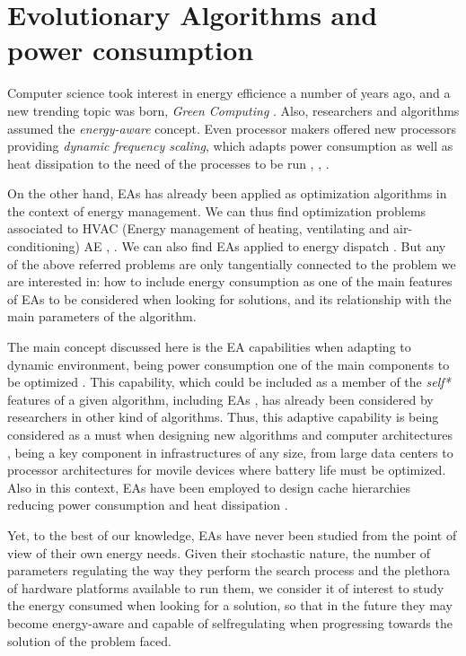 \section{Evolutionary Algorithms and power consumption}
\label{eas}

Computer science took interest in energy efficience a number of years ago, and a new trending topic was born, \textit{Green Computing} \cite{green-computing}.  Also, researchers and algorithms assumed the \textit{energy-aware} \cite{energy-aware} concept.  Even processor makers offered new processors providing \textit{dynamic frequency scaling}, which adapts power consumption as well as heat dissipation to the need of the processes to be run \cite{scaling}, \cite{dynamic-scaling}, \cite{energy-efficient}.

On the other hand, EAs has already been applied as optimization algorithms in the context of energy management.  We can thus find optimization problems associated to HVAC (Energy management of heating, ventilating and air-conditioning) AE \cite{HVAC}, \cite{chiller}.  We can also find EAs applied to energy dispatch \cite{dispatch}.  But any of the above referred problems are only tangentially connected to the problem we are interested in:  how to include energy consumption as one of the main features of EAs to be considered when looking for solutions, and its relationship with the main parameters of the algorithm.

The main concept discussed here is the EA capabilities when adapting to dynamic environment, being power consumption one of the main components to be optimized \cite{ephemeral}. This capability, which could be included as a member of the \textit{self*} features of a given algorithm, including EAs \cite{self}, has already been considered by researchers in other kind of algorithms.  Thus, this adaptive capability is being considered as a must when designing new algorithms and computer architectures \cite{energy-aware}, being a key component in infrastructures of any size, from large data centers to processor architectures for movile devices where battery life must be optimized.  Also in this context, EAs have been employed to design cache hierarchies reducing power consumption and heat dissipation \cite{cache}.

Yet, to the best of our knowledge, EAs have never been studied from the point of view of their own energy needs.  %
Given their stochastic nature, the number of parameters regulating the way they perform the search process and the plethora of hardware platforms available to run them, we consider it of interest to study the energy consumed when looking for a solution, so that in the future they may become energy-aware and capable of selfregulating when progressing towards the solution of the problem faced.

